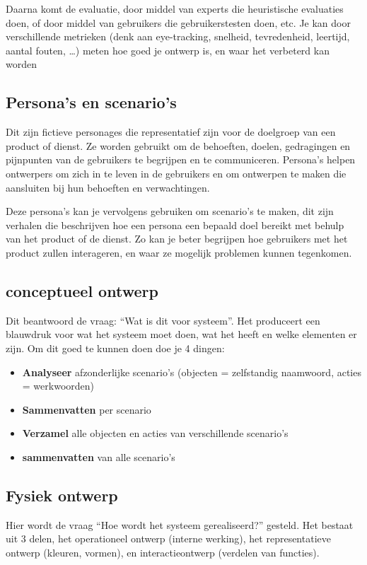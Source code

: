 \documentclass[nonacm, sigconf, balance=true]{acmart}
\begin{document}
    Daarna komt de evaluatie, door middel van experts die heuristische evaluaties doen, of door middel van gebruikers die gebruikerstesten doen, etc.
    Je kan door verschillende metrieken (denk aan eye-tracking, snelheid, tevredenheid, leertijd, aantal fouten, \ldots) meten hoe goed je ontwerp is, en waar het verbeterd kan worden

    \subsection{Persona's en scenario's}
    Dit zijn fictieve personages die representatief zijn voor de doelgroep van een product of dienst.
    Ze worden gebruikt om de behoeften, doelen, gedragingen en pijnpunten van de gebruikers te begrijpen en te communiceren.
    Persona's helpen ontwerpers om zich in te leven in de gebruikers en om ontwerpen te maken die aansluiten bij hun behoeften en verwachtingen.

    Deze persona's kan je vervolgens gebruiken om scenario's te maken, dit zijn verhalen die beschrijven hoe een persona een bepaald doel bereikt met behulp van het product of de dienst.
    Zo kan je beter begrijpen hoe gebruikers met het product zullen interageren, en waar ze mogelijk problemen kunnen tegenkomen.

    \subsection{conceptueel ontwerp}
    Dit beantwoord de vraag: ``Wat is dit voor systeem''.
    Het produceert een blauwdruk voor wat het systeem moet doen, wat het heeft en welke elementen er zijn.
    Om dit goed te kunnen doen doe je 4 dingen:

    \begin{itemize}
        \item \textbf{Analyseer} afzonderlijke scenario's (objecten = zelfstandig naamwoord, acties = werkwoorden)
        \item \textbf{Sammenvatten} per scenario
        \item \textbf{Verzamel} alle objecten en acties van verschillende scenario's
        \item \textbf{sammenvatten} van alle scenario's
    \end{itemize}

    \subsection{Fysiek ontwerp}
    Hier wordt de vraag ``Hoe wordt het systeem gerealiseerd?'' gesteld.
    Het bestaat uit 3 delen, het operationeel ontwerp (interne werking), het representatieve ontwerp (kleuren, vormen), en interactieontwerp (verdelen van functies).
\end{document}

